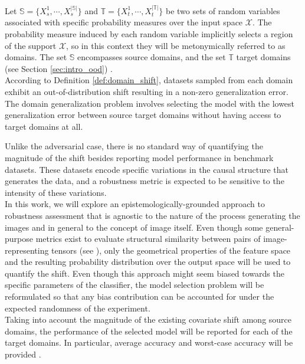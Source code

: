 \begin{definition}
    Let $\mathbb{S} = \{X_s^1, \cdots, X_s^{|\mathbb{S}|}\}$ and $\mathbb{T} = \{X_t^1, \cdots, X_t^{|\mathbb{T}|}\}$ 
    be two sets of random variables associated with specific probability measures 
    over the input space $\mathcal{X}$. The probability measure 
    induced by each random variable implicitly selects a region of
    the support $\mathcal{X}$, so in this context they will be metonymically 
    referred to as domains. The set $\mathbb{S}$ encompasses source domains,
    and the set $\mathbb{T}$ target domains (see Section \ref{sec:intro_ood})
    \cite{liuOutOfDistributionGeneralizationSurvey2023,wangGeneralizingUnseenDomains2022}. \\

    According to Definition \ref{def:domain_shift}, datasets sampled from each domain
    exhibit an out-of-distribution shift resulting in a non-zero generalization error. The 
    domain generalization problem involves selecting the model with
    the lowest generalization error between source target domains without
    having access to target domains at all. 
\end{definition}

Unlike the adversarial case, there is no standard way of quantifying
the magnitude of the shift besides reporting model performance in benchmark
datasets. These datasets encode specific variations in the causal structure that generates
the data, and a robustness metric is expected to be sensitive to the intensity
of these variations. \\

In this work, we will explore an epistemologically-grounded
approach to robustness assessment that is agnostic to the nature of the process
generating the images and in general to the concept of image itself. Even though some
general-purpose metrics exist to evaluate structural similarity between pairs 
of image-representing tensors (see \cite{guoComprehensiveEvaluationFramework2023}),
only the geometrical properties of the feature space and the resulting
probability distribution over the output space will be used to quantify the shift. Even though
this approach might seem biased towards the specific parameters of the classifier, 
the model selection problem will be reformulated so that any bias contribution
can be accounted for under the expected randomness of the experiment.\\

Taking into account the magnitude of the existing covariate shift among source
domains, the performance of the selected model will be reported for each of
the target domains. In particular, average accuracy and worst-case accuracy
will be provided \cite{zhouDomainGeneralizationSurvey2022}.

